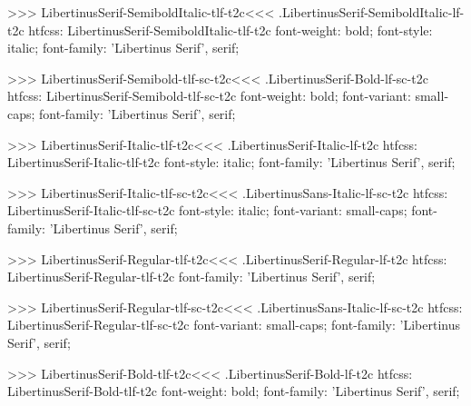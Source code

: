 {{{{{{{{{{{{{{{{>>>
\<LibertinusSerif-SemiboldItalic-tlf-t2c\><<<
.LibertinusSerif-SemiboldItalic-lf-t2c
htfcss:  LibertinusSerif-SemiboldItalic-tlf-t2c  font-weight: bold; font-style: italic; font-family: 'Libertinus Serif', serif;

>>>
\<LibertinusSerif-Semibold-tlf-sc-t2c\><<<
.LibertinusSerif-Bold-lf-sc-t2c
htfcss:  LibertinusSerif-Semibold-tlf-sc-t2c  font-weight: bold; font-variant: small-caps; font-family: 'Libertinus Serif', serif;

>>>
\<LibertinusSerif-Italic-tlf-t2c\><<<
.LibertinusSerif-Italic-lf-t2c
htfcss:  LibertinusSerif-Italic-tlf-t2c  font-style: italic; font-family: 'Libertinus Serif', serif;

>>>
\<LibertinusSerif-Italic-tlf-sc-t2c\><<<
.LibertinusSans-Italic-lf-sc-t2c
htfcss:  LibertinusSerif-Italic-tlf-sc-t2c  font-style: italic; font-variant: small-caps; font-family: 'Libertinus Serif', serif;

>>>
\<LibertinusSerif-Regular-tlf-t2c\><<<
.LibertinusSerif-Regular-lf-t2c
htfcss:  LibertinusSerif-Regular-tlf-t2c  font-family: 'Libertinus Serif', serif;

>>>
\<LibertinusSerif-Regular-tlf-sc-t2c\><<<
.LibertinusSans-Italic-lf-sc-t2c
htfcss:  LibertinusSerif-Regular-tlf-sc-t2c  font-variant: small-caps; font-family: 'Libertinus Serif', serif;

>>>
\<LibertinusSerif-Bold-tlf-t2c\><<<
.LibertinusSerif-Bold-lf-t2c
htfcss:  LibertinusSerif-Bold-tlf-t2c  font-weight: bold; font-family: 'Libertinus Serif', serif;

}}}}}}}}}}}}}}}}

